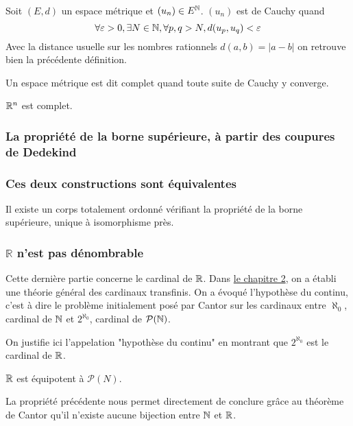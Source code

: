 \begin{defini}
    Soit $(E,d)$ un espace métrique et $(u_n) \in E^{\mathbb{N}}$. $(u_n)$ est de Cauchy quand
    $$\forall \varepsilon > 0, \exists N \in \mathbb{N}, \forall p, q > N, d(u_p, u_q) < \varepsilon$$
    \tcblower
    Avec la distance usuelle sur les nombres rationnels $d(a,b)=|a-b|$ on retrouve bien la précédente définition.
\end{defini}

\begin{defini}
    Un espace métrique est dit complet quand toute suite de Cauchy y converge.
\end{defini}

\begin{ex}
    $\mathbb{R}^n$ est complet.
    \tcblower
\end{ex}



\subsubsection{La propriété de la borne supérieure, à partir des coupures de Dedekind}

\subsubsection{Ces deux constructions sont équivalentes}
\begin{theoreme}
    Il existe un corps totalement ordonné vérifiant la propriété de la borne supérieure, unique à isomorphisme près.    
\end{theoreme}

\subsubsection{\texorpdfstring{$\mathbb{R}$}{R} n'est pas dénombrable}
Cette dernière partie concerne le cardinal de $\mathbb{R}$. Dans \hyperref[card]{le chapitre 2}, on a établi une théorie général des cardinaux transfinis. On a évoqué l'hypothèse du continu, c'est à dire le problème initialement posé par Cantor sur les cardinaux entre $\aleph_0$, cardinal de $\mathbb{N}$ et $2^{\aleph_0}$, cardinal de $\mathcal{P}(\mathbb{N})$.

On justifie ici l'appelation "hypothèse du continu" en montrant que $2^{\aleph_0}$ est le cardinal de $\mathbb{R}$.

\begin{theoreme}
    $\mathbb{R}$ est équipotent à $\mathcal{P}(N)$.
    \tcblower
\end{theoreme}

\begin{theoreme}
    La propriété précédente nous permet directement de conclure grâce au théorème de Cantor qu'il n'existe aucune bijection entre $\mathbb{N}$ et $\mathbb{R}$. 
\end{theoreme}